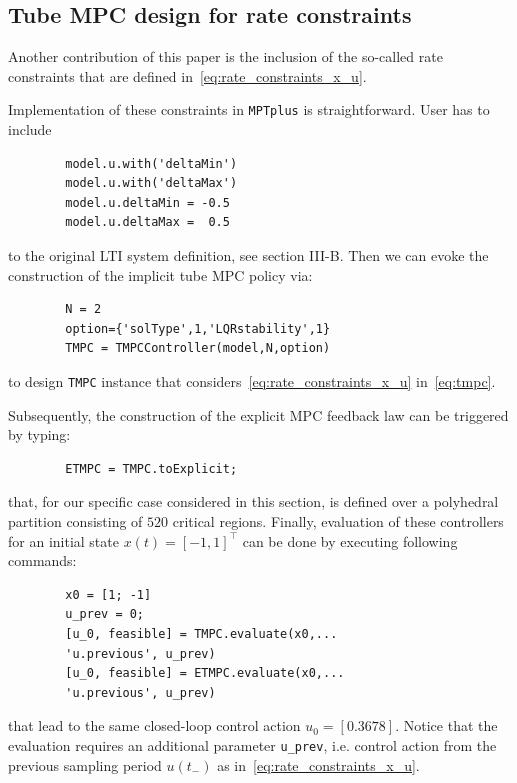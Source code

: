 \documentclass[letterpaper, 10 pt, conference]{ieeeconf}
\begin{document}
	
	
	\subsection{Tube MPC design for rate constraints}
	\label{sec:mptplus_tube_mpc_delta_u}
	
	Another contribution of this paper is the inclusion of the so-called rate constraints that are defined in~\eqref{eq:rate_constraints_x_u}.
	
	Implementation of these constraints in \texttt{MPTplus} is straightforward. User has to include 
	\begin{verbatim}
		model.u.with('deltaMin')
		model.u.with('deltaMax')
		model.u.deltaMin = -0.5
		model.u.deltaMax =  0.5
	\end{verbatim}
	to the original LTI system definition, see section III-B. Then we can evoke the construction of the implicit tube MPC policy via:
	\begin{verbatim}
		N = 2
		option={'solType',1,'LQRstability',1}
		TMPC = TMPCController(model,N,option)
	\end{verbatim}
	to design \texttt{TMPC} instance that considers~\eqref{eq:rate_constraints_x_u} in~\eqref{eq:tmpc}.
	
	Subsequently, the construction of the explicit MPC feedback law can be triggered by typing:
	\begin{verbatim}
		ETMPC = TMPC.toExplicit;
	\end{verbatim}
	that, for our specific case considered in this section, is defined over a polyhedral partition consisting of $520$ critical regions.
	Finally, evaluation of these controllers for an initial state $x(t) = [-1, 1]^\top$ can be done by executing following commands:
	\begin{verbatim}
		x0 = [1; -1]
		u_prev = 0;
		[u_0, feasible] = TMPC.evaluate(x0,...
		'u.previous', u_prev)
		[u_0, feasible] = ETMPC.evaluate(x0,...
		'u.previous', u_prev)
	\end{verbatim}
	that lead to the same closed-loop control action $u_0 = [0.3678]$.
	Notice that the evaluation requires an additional parameter \verb|u_prev|, i.e. control action from the previous sampling period $u(t_{-})$ as in~\eqref{eq:rate_constraints_x_u}.
	
\end{document}
